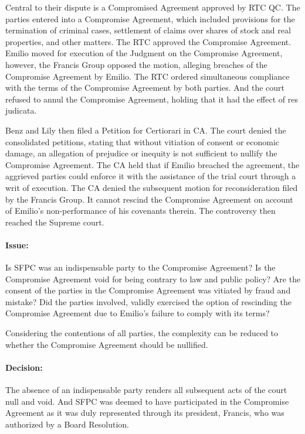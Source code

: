 \documentclass[
12pt,
oneside,
onehalfspacing,
headsepline
]{DigestCollection}
\begin{document}
Central to their dispute is a Compromised Agreement approved by RTC QC. The parties entered into a Compromise Agreement, which included provisions for the termination of criminal cases, settlement of claims over shares of stock and real properties, and other matters. The RTC approved the Compromise Agreement. Emilio moved for execution of the Judgment on the Compromise Agreement, however, the Francis Group opposed the motion, alleging breaches of the Compromise Agreement by Emilio. The RTC ordered simultaneous compliance with the terms of the Compromise Agreement by both parties. And the court refused to annul the Compromise Agreement, holding that it had the effect of res judicata.

Benz and Lily then filed a Petition for Certiorari in CA. The court denied the consolidated petitions, stating that without vitiation of consent or economic damage, an allegation of prejudice or inequity is not sufficient to nullify the Compromise Agreement. The CA held that if Emilio breached the agreement, the aggrieved parties could enforce it with the assistance of the trial court through a writ of execution. The CA denied the subsequent motion for reconsideration filed by the Francis Group. It cannot rescind the Compromise Agreement on account of Emilio's non-performance of his covenants therein. The controversy then reached the Supreme court. 

\paragraph{Issue:}
\label{c0f0ff10-09fd-11ef-932c-63c852f65e48}


Is SFPC was an indispensable party to the Compromise Agreement? Is the Compromise Agreement void for being contrary to law and public policy? Are the consent of the parties in the Compromise Agreement was vitiated by fraud and mistake? Did the parties involved, validly exercised the option of rescinding the Compromise Agreement due to Emilio's failure to comply with its terms? 

Considering the contentions of all parties, the complexity can be reduced to whether the Compromise Agreement should be nullified.

\paragraph{Decision:}
\label{c2ad06f0-09fd-11ef-932c-63c852f65e48}


The absence of an indispensable party renders all subsequent acts of the court null and void. And SFPC was deemed to have participated in the Compromise Agreement as it was duly represented through its president, Francis, who was authorized by a Board Resolution.
\end{document}
